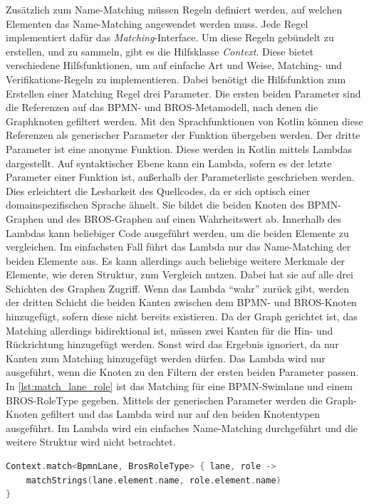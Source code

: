 Zusätzlich zum Name-Matching müssen Regeln definiert werden, auf welchen Elementen das Name-Matching angewendet werden muss.
Jede Regel implementiert dafür das \emph{Matching}-Interface.
Um diese Regeln gebündelt zu erstellen, und zu sammeln, gibt es die Hilfsklasse \emph{Context}.
Diese bietet verschiedene Hilfsfunktionen, um auf einfache Art und Weise, Matching- und Verifikations-Regeln zu implementieren.
Dabei benötigt die Hilfsfunktion zum Erstellen einer Matching Regel drei Parameter.
Die ersten beiden Parameter sind die Referenzen auf das BPMN- und BROS-Metamodell, nach denen die Graphknoten gefiltert werden.
Mit den Sprachfunktionen von Kotlin können diese Referenzen als generischer Parameter der Funktion übergeben werden.
Der dritte Parameter ist eine anonyme Funktion.
Diese werden in Kotlin mittels Lambdas dargestellt.
Auf syntaktischer Ebene kann ein Lambda, sofern es der letzte Parameter einer Funktion ist, außerhalb der Parameterliste geschrieben werden.
Dies erleichtert die Lesbarkeit des Quellcodes, da er sich optisch einer domainspezifischen Sprache ähnelt.
Sie bildet die beiden Knoten des BPMN-Graphen und des BROS-Graphen auf einen Wahrheitswert ab.
Innerhalb des Lambdas kann beliebiger Code ausgeführt werden, um die beiden Elemente zu vergleichen.
Im einfachsten Fall führt das Lambda nur das Name-Matching der beiden Elemente aus.
Es kann allerdings auch beliebige weitere Merkmale der Elemente, wie deren Struktur, zum Vergleich nutzen.
Dabei hat sie auf alle drei Schichten des Graphen Zugriff.
Wenn das Lambda ``wahr'' zurück gibt, werden der dritten Schicht die beiden Kanten zwischen dem BPMN- und BROS-Knoten hinzugefügt, sofern diese nicht bereits existieren.
Da der Graph gerichtet ist, das Matching allerdings bidirektional ist, müssen zwei Kanten für die Hin- und Rückrichtung hinzugefügt werden.
Sonst wird das Ergebnis ignoriert, da nur Kanten zum Matching hinzugefügt werden dürfen.
Das Lambda wird nur ausgeführt, wenn die Knoten zu den Filtern der ersten beiden Parameter passen.
In \cref{lst:match_lane_role} ist das Matching für eine BPMN-Swimlane und einem BROS-RoleType gegeben.
Mittels der generischen Parameter werden die Graph-Knoten gefiltert und das Lambda wird nur auf den beiden Knotentypen ausgeführt. 
Im Lambda wird ein einfaches Name-Matching durchgeführt und die weitere Struktur wird nicht betrachtet.

\begin{lstlisting}[language=Kotlin, caption=Matching Regel von einer BPMN-SwimLane und einem BROS-RoleType, label=lst:match_lane_role]
Context.match<BpmnLane, BrosRoleType> { lane, role ->
    matchStrings(lane.element.name, role.element.name)
}
\end{lstlisting}

